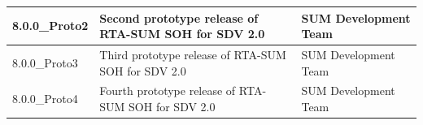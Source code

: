 \begin{longtable}{|l|l|l|}
\begin{minipage}{0.15\linewidth}\raggedright\vspace{.75ex}8.0.0\_Proto2\vspace{.75ex}\end{minipage} & \begin{minipage}{0.36\linewidth}\raggedright\vspace{.75ex}Second prototype release of RTA-SUM SOH for SDV 2.0\vspace{.75ex}\end{minipage} & \begin{minipage}{0.40\linewidth}\raggedright\vspace{.75ex}SUM Development Team\vspace{.75ex}\end{minipage}\\\hline
\begin{minipage}{0.15\linewidth}\raggedright\vspace{.75ex}8.0.0\_Proto3\vspace{.75ex}\end{minipage} & \begin{minipage}{0.36\linewidth}\raggedright\vspace{.75ex}Third prototype release of RTA-SUM SOH for SDV 2.0\vspace{.75ex}\end{minipage} & \begin{minipage}{0.40\linewidth}\raggedright\vspace{.75ex}SUM Development Team\vspace{.75ex}\end{minipage}\\\hline
\begin{minipage}{0.15\linewidth}\raggedright\vspace{.75ex}8.0.0\_Proto4\vspace{.75ex}\end{minipage} & \begin{minipage}{0.36\linewidth}\raggedright\vspace{.75ex}Fourth prototype release of RTA-SUM SOH for SDV 2.0\vspace{.75ex}\end{minipage} & \begin{minipage}{0.40\linewidth}\raggedright\vspace{.75ex}SUM Development Team\vspace{.75ex}\end{minipage}\\\hline

\end{longtable}
